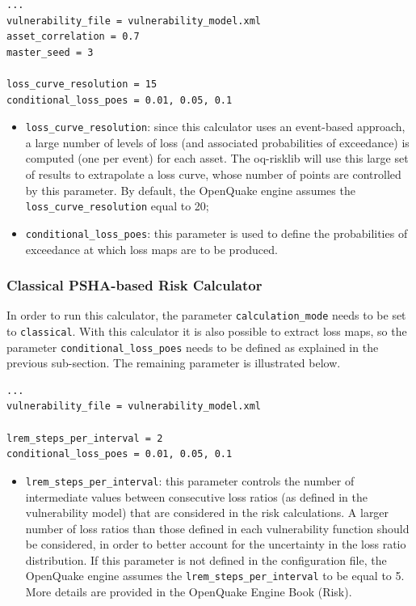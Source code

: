 \begin{Verbatim}[frame=single, commandchars=\\\{\}, samepage=true]
...
vulnerability_file = vulnerability_model.xml
asset_correlation = 0.7
master_seed = 3

loss_curve_resolution = 15
conditional_loss_poes = 0.01, 0.05, 0.1
\end{Verbatim}

\begin{itemize}
\item \Verb+loss_curve_resolution+: since this calculator uses an event\--based ap\-proach, a large number of levels of loss (and associated probabilities of exceedance) is computed (one per event) for each asset. The oq-risklib will use this large set of results to extrapolate a loss curve, whose number of points are controlled by this parameter. By default, the OpenQuake engine assumes the \Verb+loss_curve_resolution+ equal to 20;
\item  \Verb+conditional_loss_poes+: this parameter is used to define the probabilities of exceedance at which loss maps are to be produced.
\end{itemize}

\subsubsection{Classical PSHA-based Risk Calculator}
In order to run this calculator, the parameter \Verb+calculation_mode+ needs to be set to \Verb+classical+. With this calculator it is also possible to extract loss maps, so the parameter \Verb+conditional_loss_poes+ needs to be defined as explained in the previous sub-section. The remaining parameter is illustrated below.
\begin{Verbatim}[frame=single, commandchars=\\\{\}, samepage=true]
...
vulnerability_file = vulnerability_model.xml

lrem_steps_per_interval = 2
conditional_loss_poes = 0.01, 0.05, 0.1
\end{Verbatim}

\begin{itemize}
\item  \Verb+lrem_steps_per_interval+: this parameter controls the number of intermediate values between consecutive loss ratios (as defined in the \gls{vulnerability model}) that are considered in the risk calculations. A larger number of loss ratios than those defined in each \gls{vulnerability function} should be considered, in order to better account for the uncertainty in the loss ratio distribution. If this parameter is not defined in the configuration file, the OpenQuake engine assumes the \Verb+lrem_steps_per_interval+ to be equal to 5. More details are provided in the OpenQuake Engine Book (Risk).  
\end{itemize}

